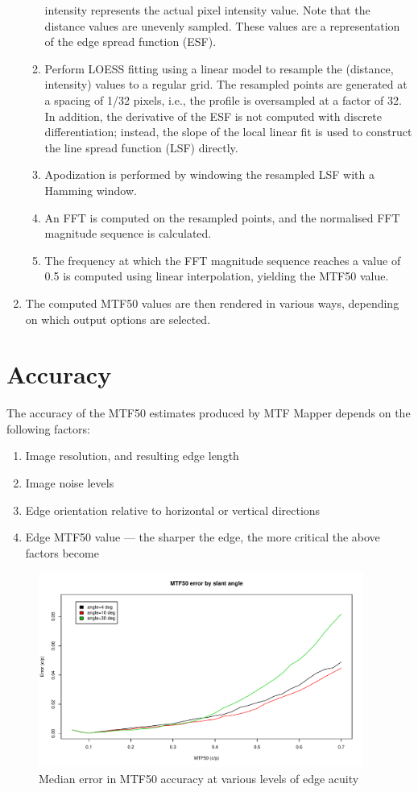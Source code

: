 \documentclass[a4paper]{article}
\begin{document}
\begin{enumerate}
\begin{enumerate}
\textsf{intensity} represents the actual pixel intensity value. Note that
the distance values are unevenly sampled. These values are a representation
of the edge spread function (ESF).
	  \item Perform LOESS fitting using a linear model to resample the 
(\textsf{distance}, \textsf{intensity}) values to a regular grid. The
resampled points are generated at a spacing of 1/32 pixels, i.e., the
profile is oversampled at a factor of 32. In addition, the derivative of the
ESF is not computed with discrete differentiation; instead, the slope of the
local linear fit is used to construct the line spread function (LSF) directly.
	  \item Apodization is performed by windowing the resampled LSF with
a Hamming window.
	  \item An FFT is computed on the resampled points, and the
normalised FFT magnitude sequence is calculated.
	  \item The frequency at which the FFT magnitude sequence reaches a
value of 0.5 is computed using linear interpolation, yielding the MTF50
value.
	\end{enumerate}
    \item The computed MTF50 values are then rendered in various ways,
depending on which output options are selected.
\end{enumerate}

\section{Accuracy}
The accuracy of the MTF50 estimates produced by MTF Mapper depends on the
following factors:
\begin{enumerate}
  \item Image resolution, and resulting edge length
  \item Image noise levels
  \item Edge orientation relative to horizontal or vertical directions
  \item Edge MTF50 value --- the sharper the edge, the more critical the
  above factors become
\end{enumerate}

\begin{figure}
\centering
\includegraphics[width=0.95\textwidth]{figures/accuracy_plot}
\caption{Median error in MTF50 accuracy at various levels of edge acuity}
\label{fig:mtf_accuracy}
\end{figure}
\end{document}

